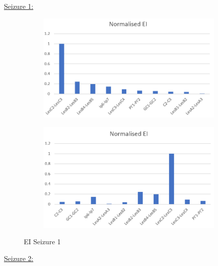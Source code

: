\documentclass[11pt,oneside]{amsart}
\begin{document}
\underline{Seizure 1:}
 
 \begin{figure}[H]
          \centering
          \begin{subfigure}[H]{0.45\textwidth}
            \centering
              \includegraphics[width=\textwidth]{figures/EI_ord_S1.PNG}
              \label{fig:EI_ordS1}
             \end{subfigure}
             \begin{subfigure}[H]{0.45\textwidth}
              \centering
              \includegraphics[width=\textwidth]{figures/EI_ch_S1.PNG}
              \label{fig:EI_chS1}
          \end{subfigure}
          \caption{EI Seizure 1}
          \label{fig:10}
        \end{figure}
      
\underline{Seizure 2:}
        
\end{document}
